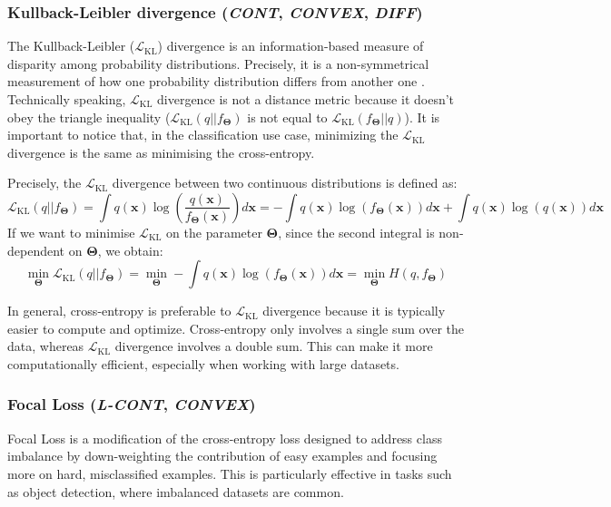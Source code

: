 \documentclass[sn-mathphys-num]{sn-jnl}%
\newcommand \cont{\textit{CONT}}
\newcommand \lcont{\textit{L-CONT}}
\newcommand \diff{\textit{DIFF}}
\newcommand \conv{\textit{CONVEX}}
\renewcommand\vec{\mathbf}
\begin{document}
\subsubsection{Kullback-Leibler divergence (\cont, \conv, \diff)}\label{sec:kl-div}
The Kullback-Leibler (\(\mathcal{L}_{\text{KL}}\)) divergence is an information-based measure of disparity among probability distributions. Precisely, it is a non-symmetrical measurement of how one probability distribution differs from another one \cite{kl_div,ML_2,ML_3}. Technically speaking, \(\mathcal{L}_{\text{KL}}\) divergence is not a distance metric because it doesn’t obey the triangle inequality (\(\mathcal{L}_{\text{KL}}(q||f_{\vec{\Theta}})\) is not equal to \(\mathcal{L}_{\text{KL}}(f_{\vec{\Theta}}||q)\)). It is important to notice that, in the classification use case, minimizing the \(\mathcal{L}_{\text{KL}}\) divergence is the same as minimising the cross-entropy.

Precisely, the \(\mathcal{L}_{\text{KL}}\) divergence between two continuous distributions is defined as:
\begin{equation}\label{eq:kl-divergence}
    \mathcal{L}_{\text{KL}}(q||f_{\vec{\Theta}}) = \int q(\vec{x})\log\left(\frac{q(\vec{x})}{f_{\vec{\Theta}}(\vec{x})}\right) d\vec{x} = - \int q(\vec{x})\log(f_{\vec{\Theta}}(\vec{x}))d\vec{x} + \int q(\vec{x})\log(q(\vec{x}))d\vec{x}
\end{equation}
If we want to minimise \(\mathcal{L}_{\text{KL}}\) on the parameter \(\vec{\Theta}\), since the second integral is non-dependent on \(\vec{\Theta}\), we obtain:
\begin{equation}
\min_{\vec{\Theta}} \mathcal{L}_{\text{KL}}(q||f_{\vec{\Theta}}) = \min_{\vec{\Theta}} - \int q(\vec{x})\log(f_{\vec{\Theta}}(\vec{x}))d\vec{x} = \min_{\vec{\Theta}} H(q, f_{\vec{\Theta}})
\end{equation}

In general, cross-entropy is preferable to \(\mathcal{L}_{\text{KL}}\) divergence because it is typically easier to compute and optimize. Cross-entropy only involves a single sum over the data, whereas \(\mathcal{L}_{\text{KL}}\) divergence involves a double sum. This can make it more computationally efficient, especially when working with large datasets.

\subsubsection{Focal Loss (\lcont, \conv)}\label{subsubsec-classification_focal_loss}
Focal Loss \cite{lin2017focal} is a modification of the cross-entropy loss designed to address class imbalance by down-weighting the contribution of easy examples and focusing more on hard, misclassified examples. This is particularly effective in tasks such as object detection, where imbalanced datasets are common.
\end{document}
